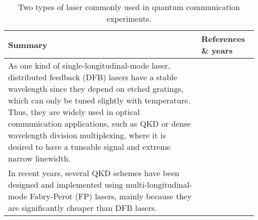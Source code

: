 \begin{table*}[!htbp]
	\begin{tabular}{|p{0.755\linewidth}|p{0.22\linewidth}|}
		\hline
		\textbf{Summary} & \textbf{References \& years} \\
		\hline \hline
		 As one kind of single-longitudinal-mode laser, distributed feedback (DFB) lasers have a stable wavelength since they depend on etched gratings, which can only be tuned slightly with temperature. Thus, they are widely used in optical communication applications, such as QKD or dense wavelength division multiplexing, where it is desired to have a tuneable signal and extreme narrow linewidth. & \cite{bib:sun2016quantum, bib:liao2017long} \\
		\hline
		 In recent years, several QKD schemes have been designed and implemented using multi-longitudinal-mode Fabry-Perot (FP) lasers, mainly because they are significantly cheaper than DFB lasers. &  \cite{bib:choi2011quantum,  bib:wang2015experimental} \\
        \hline
	\end{tabular}
	\captionspacetab \caption{Two types of laser commonly used in quantum communication experiments.} \label{tab:coherent_states}
\end{table*}

